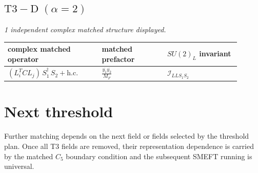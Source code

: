 \documentclass[9pt]{article}
\begin{document}
\subsection*{$ \mathrm{T3-D}\;(\alpha=2) $}
\textit{1 independent complex matched structure displayed. }
\begin{longtable}{@{}p{0.36\linewidth}p{0.25\linewidth}p{0.29\linewidth}@{}}
\toprule
complex matched operator & matched prefactor & $SU(2)_L$ invariant \\
\midrule
$ (L_i^T C L_j)\,S_1^\dagger\,S_2+\mathrm{h.c.} $ & $ \frac{\overline{y_{1}} \overline{y_{2}}}{M_F} $ & $ \mathcal{I}_{LLS_1S_2} $ \\
\bottomrule
\end{longtable}
\section*{Next threshold}
Further matching depends on the next field or fields selected by the threshold plan.  Once all T3 fields are removed, their representation dependence is carried by the matched $C_5$ boundary condition and the subsequent SMEFT running is universal.
\end{document}
